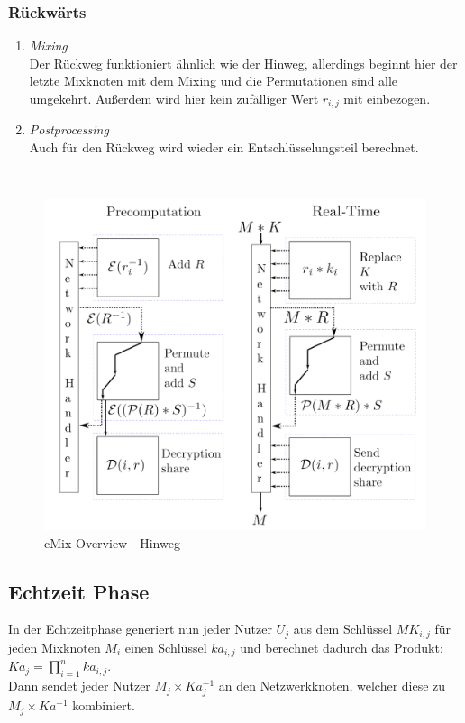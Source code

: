 \documentclass[
    fontsize=12pt,
    headings=small,
    parskip=half,           %
    bibliography=totoc,
    numbers=noenddot,       %
    open=any,               %
    final                   %
    ]{scrreprt}
\begin{document}
\subsubsection{Rückwärts}
\begin{enumerate}
	\item \textit{Mixing} \\
	Der Rückweg funktioniert ähnlich wie der Hinweg, allerdings beginnt hier der letzte Mixknoten mit dem Mixing und die Permutationen sind alle umgekehrt. Außerdem wird hier kein zufälliger Wert
	$r_{i,j}$ mit einbezogen.
	
	\item \textit{Postprocessing} \\
	Auch für den Rückweg wird wieder ein Entschlüsselungsteil berechnet.
	
\end{enumerate}
~\\
\begin{figure}[h]
\includegraphics[width=0.8
\textwidth]{Bilder/cmix_overview.png}
 \caption{cMix Overview - Hinweg} \label{graphic:overview}
\end{figure}

\subsection{Echtzeit Phase}

In der Echtzeitphase generiert nun jeder Nutzer $U_j$ aus dem Schlüssel $MK_{i,j}$
für jeden Mixknoten $M_i$ einen Schlüssel \(ka_{i,j}\) und berechnet dadurch das Produkt:
\(Ka_j = \prod_{i=1}^{n} ka_{i,j}\).\\
Dann sendet jeder Nutzer \(M_j \times Ka_j^{-1}\) an den Netzwerkknoten, welcher diese zu \(M_j \times Ka^{-1}\) kombiniert.
\end{document}
